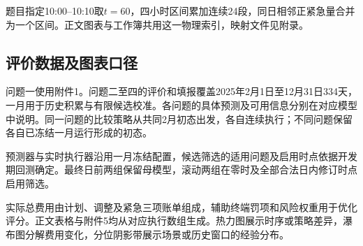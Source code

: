 题目指定10:00--10:10取$t=60$，四小时区间累加连续24段，同日相邻正紧急量合并为一个区间。正文图表与工作簿共用这一物理索引，映射文件见附录。

\subsection{评价数据及图表口径}

问题一使用附件1。问题二至四的评价和填报覆盖2025年2月1日至12月31日334天，一月用于历史积累与有限候选校准。各问题的具体预测及可用信息分别在对应模型中说明。同一问题的比较策略从共同2月初态出发，各自连续执行；不同问题保留各自已冻结一月运行形成的初态。

预测器与实时执行器沿用一月冻结配置，候选筛选的适用问题及启用时点依据开发期回测确定。最终日前两组保留母模型，滚动两组在零时及全部合法日内修订时点启用筛选。

实际总费用由计划、调整及紧急三项账单组成，辅助终端罚项和风险权重用于优化评分。正文表格与附件5均从对应执行数组生成。热力图展示时序或策略差异，瀑布图分解费用变化，分位阴影带展示场景或历史窗口的经验分布。
